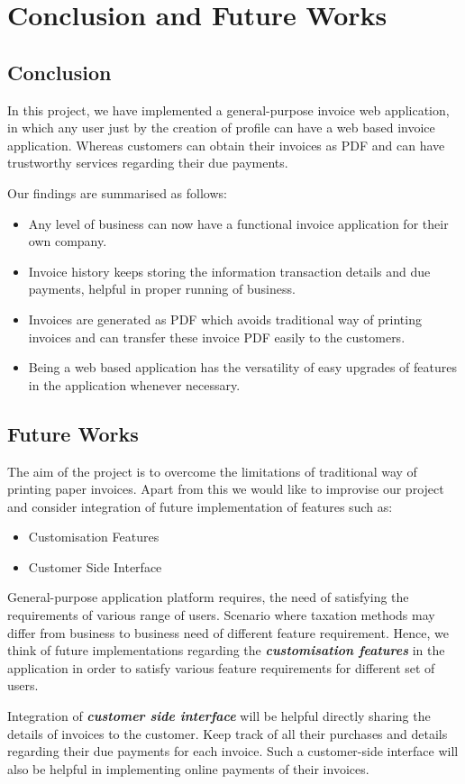 \chapter{Conclusion and Future Works}

\section{Conclusion}
In this project, we have implemented a general-purpose invoice web application, in which any user just by the creation of profile can have a web based invoice application.
Whereas customers can obtain their invoices as PDF and can have trustworthy services regarding their due payments.

Our findings are summarised as follows:
\begin{itemize}
\item Any level of business can now have a functional invoice application for their own company.
\item Invoice history keeps storing the information transaction details and due payments, helpful in proper running of business.
\item Invoices are generated as PDF which avoids traditional way of printing invoices and can transfer these invoice PDF easily to the customers. 
\item Being a web based application has the versatility of easy upgrades of features in the application whenever necessary.
\end{itemize}

\pagebreak

\section{Future Works}
The aim of the project is to overcome the limitations of traditional way of printing paper invoices. Apart from this we would like to improvise our project and consider integration of future implementation of features such as:

\begin{itemize}
\item Customisation Features
\item Customer Side Interface
\end{itemize}
General-purpose application platform requires, the need of satisfying the requirements of various range of users. Scenario where taxation methods may differ from business to business need of different feature requirement. Hence, we think of future implementations regarding the {\textbf{\textit{customisation features}}} in the application in order to satisfy various feature requirements for different set of users.

Integration of {\textbf{\textit{customer side interface}}} will be helpful directly sharing the details of invoices to the customer. Keep track of all their purchases and details regarding their due payments for each invoice. Such a customer-side interface will also be helpful in implementing online payments of their invoices.